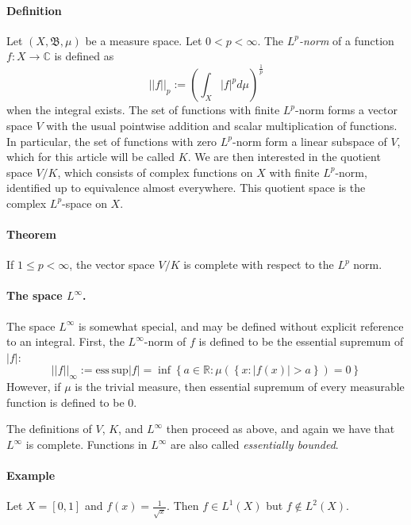 \documentclass[12pt]{article}
\newcommand{\borel}{\mathfrak{B}}
\newcommand{\reals}{\mathbb{R}}
\newcommand{\complexes}{\mathbb{C}}
\newcommand{\defined}{:=}
\newcommand{\set}[1]{\left\{#1\right\}}
\newcommand{\abs}[1]{\left|#1\right|}
\newcommand{\norm}[1]{\left|\left|#1\right|\right|}
\newcommand{\esssup}{\mathrm{ess\ sup}}
\newcommand{\Lspace}[1]{L^{#1}}
\newcommand{\Lone}{\Lspace{1}}
\newcommand{\Ltwo}{\Lspace{2}}
\newcommand{\Lp}{\Lspace{p}}
\newcommand{\Linf}{\Lspace{\infty}}
\begin{document}
\paragraph{Definition}
Let $(X, \borel, \mu)$ be a measure space. Let $0<p < \infty$.  The \emph{$\Lp$-norm} of a function $f:X\rightarrow \complexes$ is defined as
\begin{equation}
\norm{f}_{p} \defined \left(\int_{X}  \abs{f}^p d\mu \right)^{\frac{1}{p}}
\end{equation}
when the integral exists.  The set of functions with finite $\Lp$-norm forms a vector space $V$ with the usual pointwise addition and scalar 
multiplication of functions.  In particular, the set of functions with zero $\Lp$-norm form a linear subspace of $V$, which for this article 
will be called $K$.  We are then interested in the quotient space $V/K$, which consists of complex functions on $X$ with finite $\Lp$-norm, 
identified up to equivalence almost everywhere.  This quotient space is the complex $\Lp$-space on $X$.

\paragraph{Theorem} If $1 \leq p < \infty$, the vector space $V/K$ is complete with respect to the $\Lp$ norm.

\paragraph{The space $\Linf$.}
The space $\Linf$ is somewhat special, and may be defined without explicit reference to an integral.  First, the $\Linf$-norm of $f$ is 
defined to be the essential supremum of $\abs{f}$:
\begin{equation}
\norm{f}_{\infty} \defined \esssup \abs{f} = \inf \set{a \in \reals: \mu(\set{x: \abs{f(x)} > a}) = 0}
\end{equation}
However, if $\mu$ is the trivial measure, then essential supremum of every measurable function
is defined to be 0.

The definitions of $V$, $K$, and $\Linf$ then proceed as above, and again we have that $L^\infty$ is complete.  Functions in $\Linf$ are also called {\em essentially bounded}.

\paragraph{Example}
Let $X = [0,1]$ and $f(x) = \frac{1}{\sqrt{x}}$.  Then $f \in \Lone(X)$ but $f \notin \Ltwo(X)$.

\end{document}
